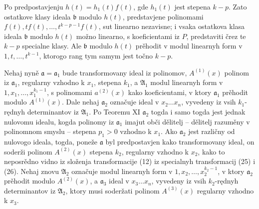 \documentclass[11pt]{article}
\providecommand{\aideal}{\mathfrak a}
\providecommand{\bideal}{\mathfrak b}
\begin{document}
Po predpostavjenju $h(t)=h_1(t)f(t)$, gde $h_1(t)$ jest stepena $k-p$. Zato ostatkove klasy ideala $\bideal$ modulo $h(t)$, predstavjene polinomami $f(t),tf(t),\ldots,t^{k-p-1}f(t)$, sut linearno nezavisne; i vsaka ostatkova klasa ideala $\bideal$ modulo $h(t)$ možno linearno, s koeficientami iz $P$, predstaviti črez te $k-p$ specialne klasy. Ale $\bideal$ modulo $h(t)$ prěhodit v modul linearnyh form v $1,t,\ldots,t^{k-1}$, ktorogo rang tym samym jest točno $k-p$.

Nehaj nyně $\aideal=\aideal_1$ bude transformovany ideal iz polinomov, $A^{(1)}(x)$ polinom iz $\aideal_1$, regularny vzhodno k $x_1$, stepena $k_1$, a $\mathfrak A_1$ modul linearnyh form v $1,x_1,\ldots,x_1^{k_1-1}$, s polinomami $a^{(2)}(x)$ kako koeficientami, v ktory $\aideal_1$ prěhodit modulo $A^{(1)}(x)$. Dale nehaj $\aideal_2$ označuje ideal v $x_2\ldots x_n$, vyvedeny iz vsih $k_1$-rędnyh determinantov iz $\mathfrak A_1$. Po Teoremu XI $\aideal_2$ togda i samo togda jest jednak nulovomu idealu, kogda polinomy iz $\aideal_1$ imajut obči dělitelj -- dělitelj razuměny v polinomnom smyslu -- stepena $p_1>0$ vzhodno k $x_1$. Ako $\aideal_2$ jest različny od nulovogo ideala, togda, poneže $\aideal$ byl predpostavjen kako transformovany ideal, on soderži polinom $A^{(2)}(x)$ stepena $k_2$, regularny vzhodno k $x_2$, kako to neposrědno vidno iz složenja transformacije (12) iz specialnyh transformacij (25) i (26). Nehaj znovu $\mathfrak A_2$ označuje modul linearnyh form v $1,x_2,\ldots,x_2^{k_2-1}$, v ktory $\aideal_2$ prěhodit modulo $A^{(2)}(x)$, a $\aideal_3$ ideal v $x_3\ldots x_n$, vyvedeny iz vsih $k_2$-rędnyh determinantov iz $\mathfrak A_2$, ktory musi soderžati polinom $A^{(3)}(x)$ regularny vzhodno k $x_3$.
\end{document}
